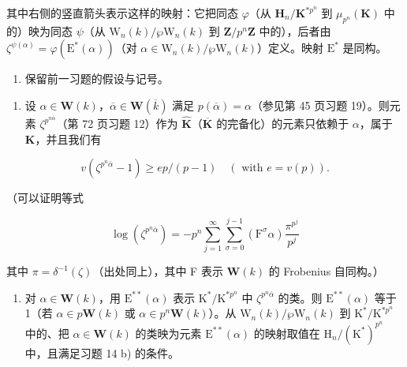 其中右侧的竖直箭头表示这样的映射：它把同态 \(\varphi\)（从 \(\mathbf{H}_n / \mathbf{K}^{*p^n}\) 到 \(\mu_{p^n}(\mathbf{K})\) 中的）映为同态 \(\psi\)（从 \(\mathrm{W}_n(k) / \wp\mathrm{W}_n(k)\) 到 \(\mathbf{Z} / p^n\mathbf{Z}\) 中的），后者由 \(\zeta^{\psi (\alpha)} = \varphi (\mathrm{E}^{*}(\alpha))\)（对 \(\alpha \in \mathrm{W}_n(k) / \wp\mathrm{W}_n(k)\)）定义。映射 \(\mathrm{E}^*\) 是同构。

\begin{enumerate}
\def\labelenumi{\arabic{enumi})}
\setcounter{enumi}{14}
\tightlist
\item
  保留前一习题的假设与记号。
\end{enumerate}

\begin{enumerate}
\def\labelenumi{\alph{enumi})}
\tightlist
\item
  设 \(\alpha \in \mathbf{W}(k)\)，\(\overline{\alpha} \in \mathbf{W}(\overline{k})\) 满足 \(p(\overline{\alpha}) = \alpha\)（参见第 45 页习题 19）。则元素 \(\zeta^{p^{n\overline{\alpha}}}\)（第 72 页习题 12）作为 \(\widehat{\mathbf{K}}\)（\(\overline{\mathbf{K}}\) 的完备化）的元素只依赖于 \(\alpha\)，属于 \(\mathbf{K}\)，并且我们有
\end{enumerate}

\[
v \left(\zeta^ {p ^ {n} \bar {\alpha}} - 1\right) \geqslant e p / (p - 1) \quad (\text { with } e = v (p)).
\]

（可以证明等式

\[
\log \left(\zeta^ {p ^ {n} \overline {{{\alpha}}}}\right) = - p ^ {n} \sum_ {j = 1} ^ {\infty} \sum_ {\sigma = 0} ^ {j - 1} \left(\mathrm{F} ^ {\sigma} \alpha\right) \frac {\pi^ {p ^ {j}}}{p ^ {j}}
\]

\(\text{其中 }\pi = \delta^{-1}(\zeta)\)（出处同上），其中 F 表示 \(\mathbf{W}(k)\) 的 Frobenius 自同构。）

\begin{enumerate}
\def\labelenumi{\alph{enumi})}
\setcounter{enumi}{1}
\tightlist
\item
  对 \(\alpha \in \mathbf{W}(k)\)，用 \(\mathrm{E}^{**}(\alpha)\) 表示 \(\mathrm{K}^* / \mathrm{K}^{*p^n}\) 中 \(\zeta^{p^n\overline{\alpha}}\) 的类。则 \(\mathrm{E}^{**}(\alpha)\) 等于 1（若 \(\alpha \in p\mathbf{W}(k)\) 或 \(\alpha \in p^n\mathbf{W}(k)\)）。从 \(\mathrm{W}_n(k)/\wp\mathrm{W}_n(k)\) 到 \(\mathrm{K}^* / \mathrm{K}^{*p^n}\) 中的、把 \(\alpha \in \mathbf{W}(k)\) 的类映为元素 \(\mathrm{E}^{**}(\alpha)\) 的映射取值在 \(\mathrm{H}_n / (\mathrm{K}^*)^{p^n}\) 中，且满足习题 14 b) 的条件。
\end{enumerate}

